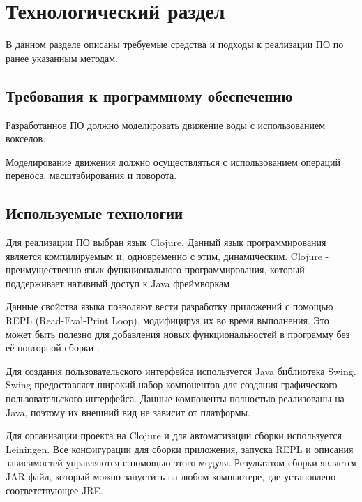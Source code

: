 \chapter{Технологический раздел}
\label{cha:impl}

В данном разделе описаны требуемые средства и подходы к реализации ПО по ранее указанным методам.


\section{Требования к программному обеспечению}

Разработанное ПО должно моделировать движение воды с использованием вокселов.

Моделирование движения должно осуществляться с использованием операций переноса, масштабирования и поворота.

\section{Используемые технологии}

Для реализации ПО выбран язык Clojure. Данный язык программирования является
компилируемым и, одновременно с этим, динамическим. Clojure - преимущественно
язык функционального программирования, который поддерживает нативный доступ к
Java фреймворкам \cite{site:clojure}.

Данные свойства языка позволяют вести разработку приложений с помощью REPL
(Read-Eval-Print Loop), модифицируя их во время выполнения. Это может быть
полезно для добавления новых функциональностей в программу без её повторной сборки
\cite{site:repl}.

Для создания пользовательского интерфейса используется Java библиотека Swing.
Swing предоставляет широкий набор компонентов для создания графического пользовательского
интерфейса. Данные компоненты полностью реализованы на Java, поэтому их внешний вид не зависит
от платформы.

Для организации проекта на Clojure и для автоматизации сборки используется Leiningen.
Все конфигурации для сборки приложения, запуска REPL и описания зависимостей управляются с помощью
этого модуля\cite{site:lein}. Результатом сборки является JAR файл, который можно запустить
на любом компьютере, где установлено соответствующее JRE.

